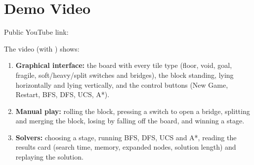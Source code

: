 \section{Demo Video}

Public YouTube link: 

The video (with  ) shows:
\begin{enumerate}[leftmargin=*]
\item \textbf{Graphical interface:} the board with every tile type (floor, void, goal, fragile,
soft/heavy/split switches and bridges), the block standing, lying horizontally and lying
vertically, and the control buttons (New Game, Restart, BFS, DFS, UCS, A*).
\item \textbf{Manual play:} rolling the block, pressing a switch to open a bridge, splitting and
merging the block, losing by falling off the board, and winning a stage.
\item \textbf{Solvers:} choosing a stage, running BFS, DFS, UCS and A*, reading the results card
(search time, memory, expanded nodes, solution length) and replaying the solution.
\end{enumerate}
